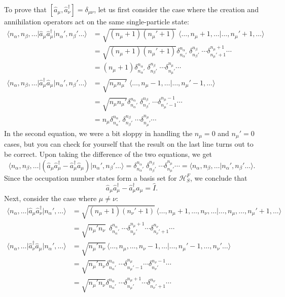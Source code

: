 \documentclass[pra,12pt]{revtex4}
\begin{document}
To prove that $[\hat{a}_\mu,\hat{a}_\nu^\dagger] = \delta_{\mu\nu}$, let us first
consider the case where the creation and annihilation operators act on
the same single-particle state:
$$\begin{aligned}\big\langle n_\alpha, n_\beta, \dots \big| \hat{a}_\mu \hat{a}_\mu^\dagger \big| n_\alpha', n_\beta'\dots\big\rangle &= \sqrt{(n_\mu+1)(n_\mu'+1)}\; \big\langle \dots, n_\mu+1, \dots \big| \dots, n_\mu'+1, \dots\big\rangle \\ &= \sqrt{(n_\mu+1)(n_\mu'+1)} \delta^{n_\alpha}_{n_\alpha'} \; \delta^{n_\beta}_{n_\beta'} \; \cdots \delta^{n_\mu+1}_{n_\mu'+1}\cdots \\ &= (n_\mu+1) \delta^{n_\alpha}_{n_\alpha'} \; \delta^{n_\beta}_{n_\beta'} \; \cdots \delta^{n_\mu}_{n_\mu'}\cdots \\ \big\langle n_\alpha, n_\beta, \dots \big| \hat{a}_\mu^\dagger \hat{a}_\mu \big| n_\alpha', n_\beta'\dots\big\rangle &= \sqrt{n_\mu n_\mu'}\; \big\langle \dots, n_\mu-1, \dots \big| \dots, n_\mu'-1, \dots\big\rangle \\&= \sqrt{n_\mu n_\mu'} \delta^{n_\alpha}_{n_\alpha'} \; \delta^{n_\beta}_{n_\beta'} \; \cdots \delta^{n_\mu-1}_{n_\mu'-1}\cdots \\ &= n_\mu \delta^{n_\alpha}_{n_\alpha'} \; \delta^{n_\beta}_{n_\beta'} \; \cdots \delta^{n_\mu}_{n_\mu'}\cdots \end{aligned}$$
In the second equation, we were a bit sloppy in handling the $n_\mu =
0$ and $n_\mu' = 0$ cases, but you can check for yourself that the
result on the last line turns out to be correct.  Upon taking the
difference of the two equations, we get
$$\big\langle n_\alpha, n_\beta, \dots \big| \left(\hat{a}_\mu \hat{a}_\mu^\dagger - \hat{a}_\mu^\dagger \hat{a}_\mu\right) \big| n_\alpha', n_\beta'\dots\big\rangle = \delta^{n_\alpha}_{n_\alpha'} \; \delta^{n_\beta}_{n_\beta'} \; \cdots \delta^{n_\mu}_{n_\mu'}\cdots = \big\langle n_\alpha, n_\beta, \dots \big| n_\alpha', n_\beta'\dots\big\rangle.$$
Since the occupation number states form a basis set for
$\mathscr{H}^F_S$, we conclude that
$$\hat{a}_\mu \hat{a}_\mu^\dagger - \hat{a}_\mu^\dagger \hat{a}_\mu = \hat{I}.$$
Next, consider the case where $\mu \ne \nu$:
$$\begin{aligned}\big\langle n_\alpha, \dots \big| \hat{a}_\mu \hat{a}_\nu^\dagger \big| n_\alpha', \dots\big\rangle &= \sqrt{(n_\mu+1)(n_\nu'+1)}\, \langle \dots, n_\mu+1, \dots, n_\nu, \dots | \dots, n_\mu, \dots, n_\mu'+1, \dots\rangle \\ &= \sqrt{n_\mu' n_\nu} \;\, \delta^{n_\alpha}_{n_\alpha'} \; \cdots \delta^{n_\mu+1}_{n_\mu'} \cdots \delta^{n_\nu}_{n_\nu' + 1}\cdots \\ \big\langle n_\alpha, \dots \big| \hat{a}_\nu^\dagger \hat{a}_\mu \big| n_\alpha', \dots\big\rangle &= \sqrt{n_\mu' n_\nu}\, \langle \dots, n_\mu, \dots,n_\nu-1,\dots | \dots, n_\mu'-1, \dots, n_\nu'\dots\rangle \\&= \sqrt{n_\mu' n_\nu} \delta^{n_\alpha}_{n_\alpha'} \; \cdots \delta^{n_\mu}_{n_\mu'-1}\cdots \delta^{n_\nu-1}_{n_\nu'} \cdots \\ &= \sqrt{n_\mu' n_\nu} \delta^{n_\alpha}_{n_\alpha'} \; \cdots \delta^{n_\mu+1}_{n_\mu'}\cdots \delta^{n_\nu}_{n_\nu'+1} \cdots\end{aligned}$$
\end{document}
